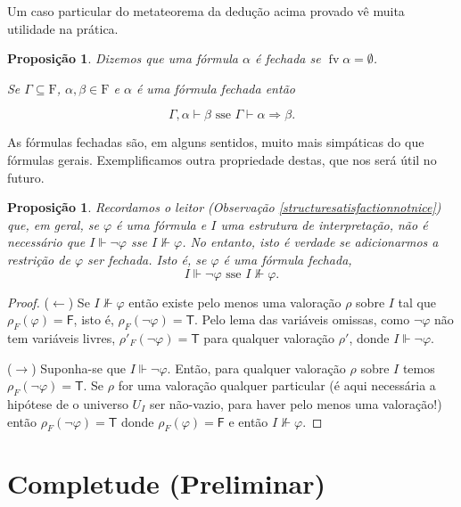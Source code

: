 \documentclass{report}
\newtheorem{prop}{Proposição}
\newtheorem*{prop*}{Proposição}
\theoremstyle{definition}
\theoremstyle{remark}
\newcommand{\F}{\mathrm{F}}
\newcommand{\lt}{\mathsf{T}}
\newcommand{\lf}{\mathsf{F}}
\DeclareMathOperator{\fv}{fv}
\newcommand{\imply}{\mathbin{\Rightarrow}}
\begin{document}
	Um caso particular do metateorema da dedução acima provado vê muita utilidade na prática.
	
	\begin{prop*}
	Dizemos que uma fórmula $\alpha$ é \emph{fechada} se $\fv \alpha = \emptyset$.
	
	Se $\Gamma \subseteq \F$, $\alpha, \beta \in \F$ e $\alpha$ é uma fórmula fechada então
	
	\[\Gamma, \alpha \vdash \beta \text{ sse } \Gamma \vdash \alpha \imply \beta.\]
	\end{prop*}
	
	As fórmulas fechadas são, em alguns sentidos, muito mais simpáticas do que fórmulas gerais. Exemplificamos outra propriedade destas, que nos será útil no futuro.
	
	\begin{prop}\label{fol:closednegnvdash}
	Recordamos o leitor (Observação \ref{structuresatisfactionnotnice}) que, em geral, se $\varphi$ é uma fórmula e $I$ uma estrutura de interpretação, não é necessário que $I \Vdash \neg \varphi$ sse $I \nVdash \varphi$. No entanto, isto é verdade se adicionarmos a restrição de $\varphi$ ser fechada. Isto é, se $\varphi$ é uma fórmula fechada,
	\[I \Vdash \neg \varphi \text{ sse } I \nVdash \varphi.\]
	\end{prop}
	
	\begin{proof}
	($\leftarrow$) Se $I \nVdash \varphi$ então existe pelo menos uma valoração $\rho$ sobre $I$ tal que $\rho_F(\varphi) = \lf$, isto é, $\rho_F(\neg \varphi) = \lt$. Pelo lema das variáveis omissas, como $\neg \varphi$ não tem variáveis livres, $\rho'_F(\neg \varphi) = \lt$ para qualquer valoração $\rho'$, donde $I \Vdash \neg \varphi$.
	
	($\rightarrow$) Suponha-se que $I \Vdash \neg \varphi$. Então, para qualquer valoração $\rho$ sobre $I$ temos $\rho_F(\neg \varphi) = \lt$. Se $\rho$ for uma valoração qualquer particular (é aqui necessária a hipótese de o universo $U_I$ ser não-vazio, para haver pelo menos uma valoração!) então $\rho_F(\neg \varphi) = \lt$ donde $\rho_F(\varphi) = \lf$ e então $I \nVdash \varphi$.
	\end{proof}
	
	\section{Completude (Preliminar)}
	\setcounter{ideia}{0}
	\setcounter{obstaculo}{0}
	
\end{document}
